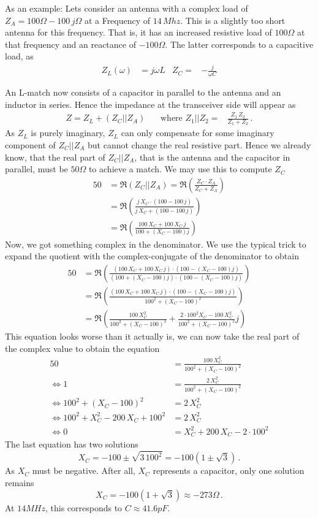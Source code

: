 \documentclass[10pt, a4paper,twoside]{scrartcl}
\begin{document}
As an example: Lets consider an antenna with a complex load of $Z_A = 100\Omega - 100\,j\Omega$ at a Frequency of $14\,Mhz$. This is a slightly too short antenna for this frequency. That is, it has an increased resistive load of $100\Omega$ at that frequency and an reactance of $-100\Omega$. The latter corresponds to a capacitive load, as 
\begin{align*}
 Z_L(\omega) &= j\omega L  & Z_C=&-\frac{j}{\omega C} 
\end{align*}

An L-match now consists of a capacitor in parallel to the antenna and an inductor in series. Hence the impedance at the transceiver side will appear as
\begin{align*}
 Z = Z_L + (Z_C || Z_A)\, && \text{where }Z_1||Z_2 =&\frac{Z_1\,Z_2}{Z_1+Z_2}\,.
\end{align*}
As $Z_L$ is purely imaginary, $Z_L$ can only compensate for some imaginary component of $Z_C||Z_A$ but cannot change the real resistive part. Hence we already know, that the real part of $Z_C||Z_A$, that is the antenna and the capacitor in parallel, must be $50\Omega$ to achieve a match. We may use this to compute $Z_C$ 
\begin{align*}
 50 &= \mathfrak{R}\left(Z_C || Z_A\right) = \mathfrak{R}\left(\frac{Z_C\cdot Z_A}{Z_C+Z_A}\right) \\
  &= \mathfrak{R}\left(\frac{j\,X_C\cdot (100-100\,j)}{j\,X_C+(100-100\,j)}\right)\\
  &= \mathfrak{R}\left(\frac{100\,X_C + 100\,X_C\,j}{100 + (X_C-100)j}\right)
\end{align*} 
Now, we got something complex in the denominator. We use the typical trick to expand the quotient with the complex-conjugate of the denominator to obtain
\begin{align*}
 50 &= \mathfrak{R}\left(\frac{(100\,X_C + 100\,X_C\,j)\cdot(100-(X_C-100)j)}{(100+(X_C-100)j)\cdot(100-(X_C-100)j)}\right) \\
  &= \mathfrak{R}\left(\frac{(100\,X_C + 100\,X_C\,j)\cdot(100-(X_C-100)j)}{100^2+(X_C-100)^2}\right)\\
  &= \mathfrak{R}\left(\frac{100\,X_C^2}{100^2+(X_C-100)^2} + \frac{2\cdot 100^2X_C-100\,X_C^2}{100^2+(X_C-100)^2}j\right)
\end{align*} 
This equation looks worse than it actually is, we can now take the real part of the complex value to obtain the equation
\begin{align*}
 50 &= \frac{100\,X_C^2}{100^2+(X_C-100)^2} \\
 \Leftrightarrow 1 &= \frac{2\,X_C^2}{100^2+(X_C-100)^2} \\
 \Leftrightarrow 100^2+(X_C-100)^2 &= 2\,X_C^2 \\
 \Leftrightarrow 100^2+X_C^2-200\,X_C + 100^2 &= 2\,X_C^2 \\ 
 \Leftrightarrow 0 &= X_C^2+200\,X_C-2\cdot100^2
\end{align*}
The last equation has two solutions
$$
 X_C = -100 \pm \sqrt{3\,100^2} = -100 (1\pm \sqrt{3})\,.
$$
As $X_C$ must be negative. After all, $X_C$ represents a capacitor, only one solution remains
$$
 X_C = -100(1+\sqrt{3}) \approx -273\Omega\,.
$$
At $14MHz$, this corresponds to $C\approx 41.6pF$. 
\end{document}
